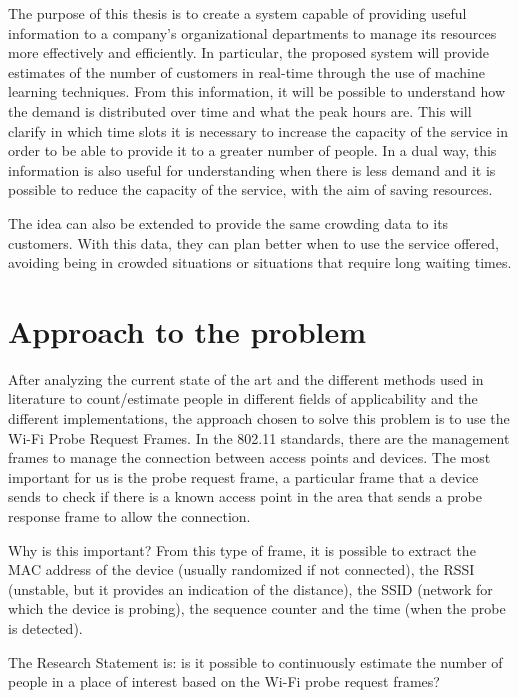The purpose of this thesis is to create a system capable of providing useful information to a company's organizational departments to manage its resources more effectively and efficiently. In particular, the proposed system will provide estimates of the number of customers in real-time through the use of machine learning techniques.
From this information, it will be possible to understand how the demand is distributed over time and what the peak hours are. This will clarify in which time slots it is necessary to increase the capacity of the service in order to be able to provide it to a greater number of people. In a dual way, this information is also useful for understanding when there is less demand and it is possible to reduce the capacity of the service, with the aim of saving resources.

The idea can also be extended to provide the same crowding data to its customers. With this data, they can plan better when to use the service offered, avoiding being in crowded situations or situations that require long waiting times.


\section{Approach to the problem} 
\label{sec:approach}
\vspace{0.2 cm} 

After analyzing the current state of the art and the different methods used in literature to count/estimate people in different fields of applicability and the different implementations, the approach chosen to solve this problem is to use the Wi-Fi Probe Request Frames.
In the 802.11 standards, there are the management frames to manage the connection between access points and devices. The most important for us is the probe request frame, a particular frame that a device sends to check if there is a known access point in the area that sends a probe response frame to allow the connection.

Why is this important? From this type of frame, it is possible to extract the MAC address of the device (usually randomized if not connected), the RSSI (unstable, but it provides an indication of the distance), the SSID (network for which the device is probing), the sequence counter and the time (when the probe is detected).

The Research Statement is: is it possible to continuously estimate the number of people in a place of interest based on the Wi-Fi probe request frames?

